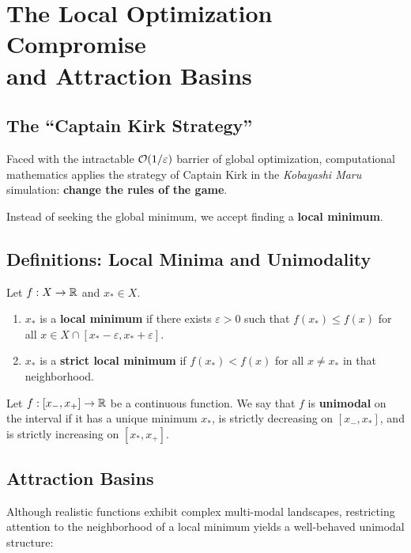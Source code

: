 \FloatBarrier
\section[The Local Optimization Compromise and Attraction Basins]{The Local Optimization Compromise\\and Attraction Basins}
\label{sec:univariate-local-compromise-en}

\subsection{The ``Captain Kirk Strategy''}
Faced with the intractable $\mathcal{O}\!\left(1/\varepsilon\right)$ barrier of global optimization, computational mathematics applies the strategy of Captain Kirk in the \textit{Kobayashi Maru} simulation: \textbf{change the rules of the game}.

Instead of seeking the global minimum, we accept finding a \textbf{local minimum}.

\subsection{Definitions: Local Minima and Unimodality}
\begin{definition}
Let $f: X \to \mathbb{R}$ and $x_* \in X$.
\begin{enumerate}
    \item $x_*$ is a \textbf{local minimum} if there exists $\varepsilon > 0$ such that $f(x_*) \le f(x)$ for all $x \in X \cap [x_* - \varepsilon, x_* + \varepsilon]$.
    \item $x_*$ is a \textbf{strict local minimum} if $f(x_*) < f(x)$ for all $x \neq x_*$ in that neighborhood.
\end{enumerate}
\end{definition}

\begin{definition}
Let $f: [x_-, x_+] \to \mathbb{R}$ be a continuous function. We say that $f$ is \textbf{unimodal} on the interval if it has a unique minimum $x_*$, is strictly decreasing on $[x_-, x_*]$, and is strictly increasing on $[x_*, x_+]$.
\end{definition}

\subsection{Attraction Basins}
Although realistic functions exhibit complex multi-modal landscapes, restricting attention to the neighborhood of a local minimum yields a well-behaved unimodal structure:

